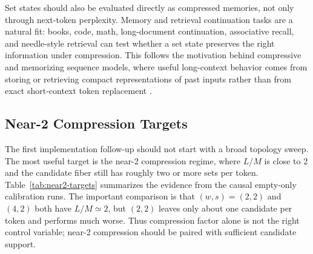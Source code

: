 \documentclass{article}
\theoremstyle{plain}
\theoremstyle{definition}
\theoremstyle{remark}
\begin{document}
Set states should also be evaluated directly as compressed memories, not
only through next-token perplexity.  Memory and retrieval continuation tasks are
a natural fit: books, code, math, long-document continuation, associative
recall, and needle-style retrieval can test whether a set state preserves the
right information under compression.  This follows the motivation behind
compressive and memorizing sequence models, where useful long-context behavior
comes from storing or retrieving compact representations of past inputs rather
than from exact short-context token replacement
\citep{rae2019compressive,wu2022memorizing}.

\FloatBarrier

\subsection{Near-2 Compression Targets}
\label{sec:near2-targets}

The first implementation follow-up should not start with a broad topology
sweep.  The most useful target is the near-2 compression regime, where $L/M$ is
close to 2 and the candidate fiber still has roughly two or more sets per token.
Table~\ref{tab:near2-targets} summarizes the evidence from the causal
empty-only calibration runs.  The important comparison is that $(w,s)=(2,2)$
and $(4,2)$ both have $L/M\simeq 2$, but $(2,2)$ leaves only about one candidate
per token and performs much worse.  Thus compression factor alone is not the
right control variable; near-2 compression should be paired with sufficient
candidate support.

\begin{table}[t]
\centering
\caption{Near-2 compression evidence from the causal empty-only calibration
summary at $D=384$, $d_{\mathrm{ff}}=1536$, $L=512$, and LR $10^{-4}$.  Values
are mean validation perplexity and peak VRAM over the available seeds from
\texttt{a7\_backend\_family\_empty\_only\_augmented\_summary.tsv}.}
\label{tab:near2-targets}
\scriptsize
{}
\end{table}
\end{document}
